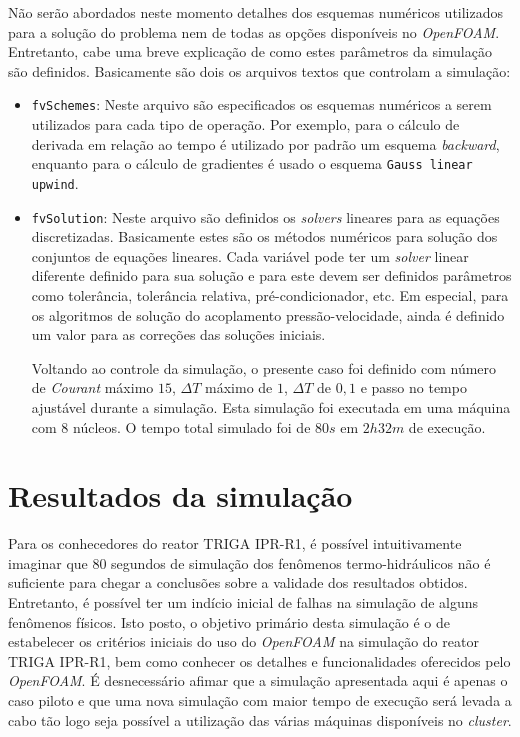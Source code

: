 \documentclass[12pt,openright,twoside,a4paper,english,french,spanish,brazil]{abntex2}
\begin{document}
Não serão abordados neste momento detalhes dos esquemas numéricos utilizados para a solução do problema nem de todas as opções 
disponíveis no \textit{OpenFOAM}. Entretanto, cabe uma breve explicação de como estes parâmetros da simulação são definidos. 
Basicamente são dois os arquivos textos que controlam a simulação:
\begin{itemize}
\item \texttt{fvSchemes}: Neste arquivo são especificados os esquemas numéricos a serem utilizados para cada tipo de 
operação. Por exemplo, para o cálculo de derivada em relação ao tempo é utilizado por padrão um esquema \textit{backward}, 
enquanto para o cálculo de gradientes é usado o esquema \texttt{Gauss linear upwind}.

\item \texttt{fvSolution}: Neste arquivo são definidos os \textit{solvers} lineares para as equações discretizadas. 
Basicamente estes são os métodos numéricos para solução dos conjuntos de equações lineares. Cada variável pode 
ter um \textit{solver} linear diferente definido para sua solução e para este devem ser definidos parâmetros 
como tolerância, tolerância relativa, pré-condicionador, etc. Em especial, para os algoritmos de solução 
do acoplamento pressão-velocidade, ainda é definido um valor para as correções das soluções iniciais.

Voltando ao controle da simulação, o presente caso foi definido com número de \textit{Courant} máximo $15$, 
$\Delta T$ máximo de $1$, $\Delta T$ de $0,1$ e passo no tempo ajustável durante a simulação. Esta simulação foi executada 
em uma máquina com $8$ núcleos. O tempo total simulado foi de $80 s$ em $2h32m$ de execução.
\end{itemize}

\section{Resultados da simulação}
\label{sec:results}
Para os conhecedores do reator TRIGA IPR-R1, é possível intuitivamente imaginar que 80 segundos de simulação dos 
fenômenos termo-hidráulicos não é suficiente para chegar a conclusões sobre a validade dos resultados obtidos. Entretanto, 
é possível ter um indício inicial de falhas na simulação de alguns fenômenos físicos. Isto posto, o objetivo primário desta 
simulação é o de estabelecer os critérios iniciais do uso do \textit{OpenFOAM} na simulação 
do reator TRIGA IPR-R1, bem como conhecer os detalhes e funcionalidades oferecidos pelo \textit{OpenFOAM}. É desnecessário 
afimar que a simulação apresentada aqui é apenas o caso piloto e que uma nova simulação com maior tempo de execução será 
levada a cabo tão logo seja possível a utilização das várias máquinas disponíveis no \textit{cluster}.
\end{document}
